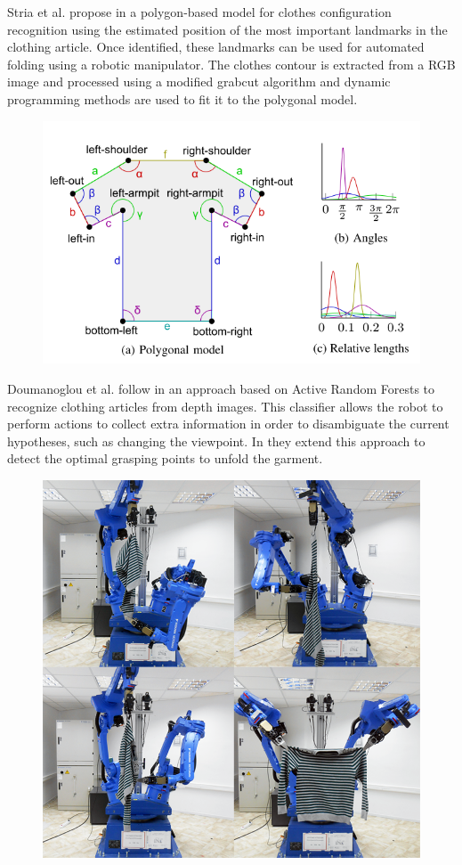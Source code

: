 Stria et al. propose in \cite{Stria2014, Stria2014IROS} a polygon-based model for clothes configuration recognition using the estimated position of the most important landmarks in the clothing article. Once identified, these landmarks can be used for automated folding using a robotic manipulator. The clothes contour is extracted from a RGB image and processed using a modified grabcut algorithm and dynamic programming methods are used to fit it to the polygonal model.

\begin{figure}[thpb]
    \centering
    \includegraphics[width=0.7
    \textwidth]{figures/SOTA_Stria_2014-2.png}
    \caption{}
    \label{fig:SOTA_Stria_2014}
\end{figure}


Doumanoglou et al. follow in \cite{Doumanoglou2014ECCV} an approach based on Active Random Forests to recognize clothing articles from depth images. This classifier allows the robot to perform actions to collect extra information in order to disambiguate the current hypotheses, such as changing the viewpoint. In \cite{Doumanoglou2014ICRA} they extend this approach to detect the optimal grasping points to unfold the garment.


\begin{figure}[thpb]
    \centering
    \includegraphics[width=0.7
    \textwidth]{figures/SOTA_Doumanoglou_2014.png}
    \caption{}
    \label{fig:SOTA_Doumanoglou_2014}
\end{figure}



